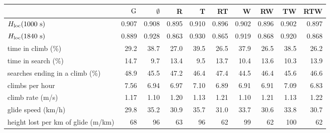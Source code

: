 \begin{tabular}{@{}l r r r r r r r r r @{}}
\toprule
 & $\mathrm{G}$ & $\emptyset$ & R & T & RT & W & RW & TW & RTW \\
\midrule
$H_\mathrm{loc}(1000~\mathrm{s})$ & 0.907 & 0.908 & 0.895 & 0.910 & 0.896 & 0.902 & 0.896 & 0.902 & 0.897 \\
$H_\mathrm{loc}(1840~\mathrm{s})$ & 0.889 & 0.928 & 0.863 & 0.930 & 0.865 & 0.919 & 0.868 & 0.920 & 0.868 \\
time in climb (\%) & 29.2 & 38.7 & 27.0 & 39.5 & 26.5 & 37.9 & 26.5 & 38.5 & 26.2 \\
time in search (\%) & 14.7 & 9.7 & 13.4 & 9.5 & 13.7 & 10.4 & 13.6 & 10.3 & 13.9 \\
searches ending in a climb (\%) & 48.9 & 45.5 & 47.2 & 46.4 & 47.4 & 44.5 & 46.4 & 45.6 & 46.6 \\
climbs per hour & 7.56 & 6.94 & 6.97 & 7.10 & 6.89 & 6.91 & 6.91 & 7.09 & 6.83 \\
climb rate (m/s) & 1.17 & 1.10 & 1.20 & 1.13 & 1.21 & 1.10 & 1.21 & 1.13 & 1.22 \\
glide speed (km/h) & 29.8 & 35.2 & 30.9 & 35.7 & 31.0 & 33.7 & 30.6 & 33.8 & 30.7 \\
height lost per km of glide (m/km) & 68 & 96 & 63 & 96 & 62 & 99 & 62 & 100 & 62 \\
\bottomrule
\end{tabular}
